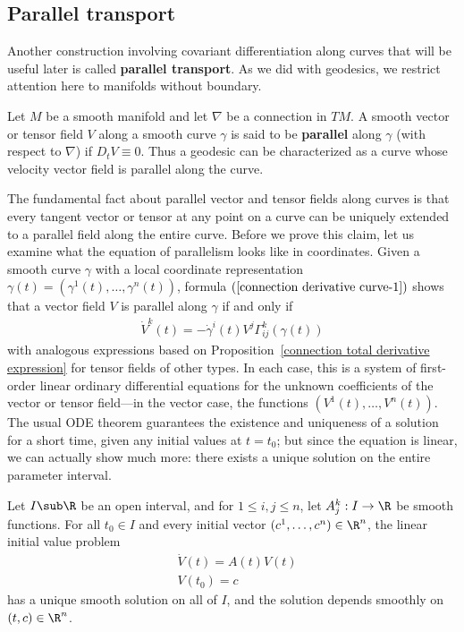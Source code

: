 \subsection{Parallel transport}
Another construction involving covariant differentiation along curves that will be useful later is called \textbf{parallel transport}. As we did with geodesics, 
we restrict attention here to manifolds without boundary.\par
Let $M$ be a smooth manifold and let $\nabla$ be a connection in $TM$. A smooth vector or tensor field $V$ along a smooth curve $\gamma$ is said to be \textbf{parallel} 
along $\gamma$ (with respect to $\nabla$) if $D_tV\equiv0$. Thus a geodesic can be characterized as a curve whose velocity vector field is parallel along the curve.\par
The fundamental fact about parallel vector and tensor fields along curves is that every tangent vector or tensor at any point on a curve can be uniquely extended to a 
parallel field along the entire curve. Before we prove this claim, let us examine what the equation of parallelism looks like in coordinates. Given a smooth curve $\gamma$ 
with a local coordinate representation $\gamma(t)=(\gamma^1(t),\dots,\gamma^n(t))$, formula $(\ref{connection derivative curve-1})$ shows that a vector field $V$ is parallel along $\gamma$ if and 
only if
\begin{align}\label{connection parallel equation}
\dot{V}^k(t)=-\dot{\gamma}^i(t)V^j\Gamma_{ij}^k(\gamma(t))
\end{align}
with analogous expressions based on Proposition~\ref{connection total derivative expression} for tensor fields of other types. In each case, this is a system of 
first-order linear ordinary differential equations for the unknown coefficients of the vector or tensor field---in the vector case, the functions $(V^1(t),\dots,V^n(t))$. 
The usual ODE theorem guarantees the existence and uniqueness of a solution for a short time, given any initial values at $t=t_0$; but since the equation is linear, we 
can actually show much more: there exists a unique solution on the entire parameter interval.
\begin{theorem}\label{linear ODE existence unique}
Let $I\sub\R$ be an open interval, and for $1\leq i,j\leq n$, let $A^k_j:I\to\R$ be smooth functions. For all $t_0\in I$ and every initial vector $(c^1,\dots,c^n)\in\R^n$, 
the linear initial value problem
\begin{equation}\label{linear ODE-1}
\begin{aligned}
&\dot{V}(t)=A(t)V(t)\\
&V(t_0)=c
\end{aligned}
\end{equation}
has a unique smooth solution on all of $I$, and the solution depends smoothly on $(t,c)\in\R^n$.
\end{theorem}
